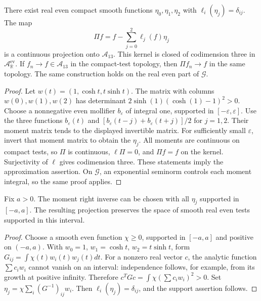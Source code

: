 \begin{proposition}
\label{v4-arith:w6-b:lem:strip-width}
\label{v4-arith:w6-b:prop:union-density-weight}
There exist real even compact smooth functions $\eta_0,\eta_1,\eta_2$
with $\ell_i(\eta_j)=\delta_{ij}$. The map
\begin{equation}
\label{v4-arith:w6-b:eq:union-weight}
 \Pi f=f-\sum_{j=0}^2\ell_j(f)\eta_j
\end{equation}
is a continuous projection onto $\mathscr A_{13}$.
This kernel is closed of codimension three in
$\mathscr A_{\mathbb R}^{\mathrm{ev}}$.
If $f_n\to f\in\mathscr A_{13}$ in the compact-test topology, then
$\Pi f_n\to f$ in the same topology. The same construction holds
on the real even part of $\mathscr G$.
\end{proposition}
\begin{proof}
Let $w(t)=(1,\cosh t,t\sinh t)$. The matrix with columns
$w(0),w(1),w(2)$ has determinant
$2\sinh(1)(\cosh(1)-1)^2>0$.
Choose a nonnegative even mollifier $b_\varepsilon$ of integral one,
supported in $[-\varepsilon,\varepsilon]$. Use the three functions
$b_\varepsilon(t)$ and
$[b_\varepsilon(t-j)+b_\varepsilon(t+j)]/2$ for $j=1,2$.
Their moment matrix tends to the displayed invertible matrix.
For sufficiently small $\varepsilon$, invert that moment matrix
to obtain the $\eta_j$.
All moments are continuous on compact tests, so $\Pi$ is continuous,
$\ell\Pi=0$, and $\Pi f=f$ on the kernel. Surjectivity of $\ell$
gives codimension three. These statements imply the approximation
assertion. On $\mathscr G$, an exponential seminorm controls each
moment integral, so the same proof applies.
\end{proof}


\begin{proposition}
Fix $a>0$. The moment right inverse can be chosen with all
$\eta_j$ supported in $[-a,a]$. The resulting projection preserves
the space of smooth real even tests supported in this interval.
\end{proposition}
\begin{proof}
Choose a smooth even function $\chi\ge0$, supported in $[-a,a]$
and positive on $(-a,a)$. With $w_0=1$, $w_1=\cosh t$,
$w_2=t\sinh t$, form
$G_{ij}=\int\chi(t)w_i(t)w_j(t)dt$.
For a nonzero real vector $c$, the analytic function $\sum c_iw_i$
cannot vanish on an interval: independence follows, for example,
from its growth at positive infinity. Therefore
$c^TGc=\int\chi(\sum c_iw_i)^2>0$.
Set $\eta_j=\chi\sum_i(G^{-1})_{ij}w_i$.
Then $\ell_i(\eta_j)=\delta_{ij}$, and the support assertion follows.
\end{proof}

